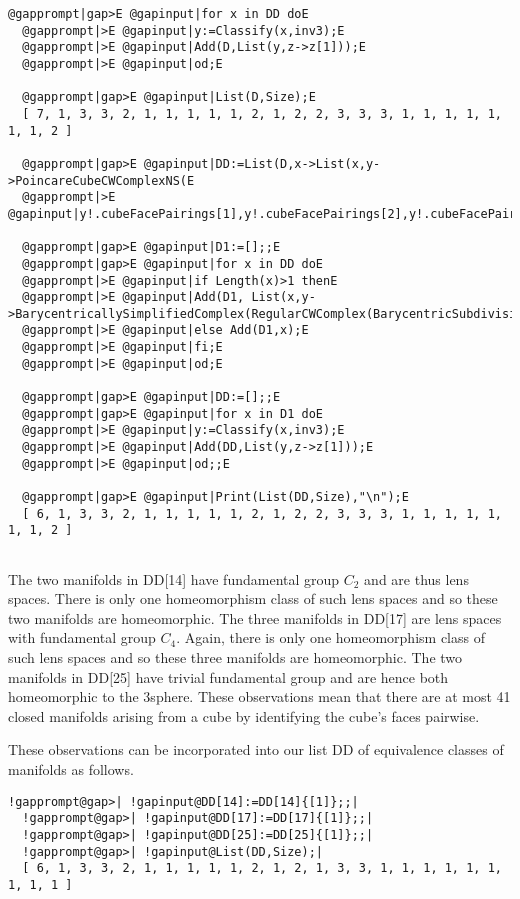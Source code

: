 \documentclass[a4paper,11pt]{report}
\begin{document}
{{\begin{Verbatim}[commandchars=@|E,fontsize=\small,frame=single,label=Example]
  @gapprompt|gap>E @gapinput|for x in DD doE
  @gapprompt|>E @gapinput|y:=Classify(x,inv3);E
  @gapprompt|>E @gapinput|Add(D,List(y,z->z[1]));E
  @gapprompt|>E @gapinput|od;E
  
  @gapprompt|gap>E @gapinput|List(D,Size);E
  [ 7, 1, 3, 3, 2, 1, 1, 1, 1, 1, 2, 1, 2, 2, 3, 3, 3, 1, 1, 1, 1, 1, 1, 1, 2 ]
  
  @gapprompt|gap>E @gapinput|DD:=List(D,x->List(x,y->PoincareCubeCWComplexNS(E
  @gapprompt|>E @gapinput|y!.cubeFacePairings[1],y!.cubeFacePairings[2],y!.cubeFacePairings[3])));;E
  
  @gapprompt|gap>E @gapinput|D1:=[];;E
  @gapprompt|gap>E @gapinput|for x in DD doE
  @gapprompt|>E @gapinput|if Length(x)>1 thenE
  @gapprompt|>E @gapinput|Add(D1, List(x,y->BarycentricallySimplifiedComplex(RegularCWComplex(BarycentricSubdivision(y)))));E
  @gapprompt|>E @gapinput|else Add(D1,x);E
  @gapprompt|>E @gapinput|fi;E
  @gapprompt|>E @gapinput|od;E
  
  @gapprompt|gap>E @gapinput|DD:=[];;E
  @gapprompt|gap>E @gapinput|for x in D1 doE
  @gapprompt|>E @gapinput|y:=Classify(x,inv3);E
  @gapprompt|>E @gapinput|Add(DD,List(y,z->z[1]));E
  @gapprompt|>E @gapinput|od;;E
  
  @gapprompt|gap>E @gapinput|Print(List(DD,Size),"\n");E
  [ 6, 1, 3, 3, 2, 1, 1, 1, 1, 1, 2, 1, 2, 2, 3, 3, 3, 1, 1, 1, 1, 1, 1, 1, 2 ]
  
\end{Verbatim}
 

The two manifolds in DD[14] have fundamental group $C_2$ and are thus lens spaces. There is only one homeomorphism class of such lens
spaces and so these two manifolds are homeomorphic. The three manifolds in
DD[17] are lens spaces with fundamental group $C_4$. Again, there is only one homeomorphism class of such lens spaces and so
these three manifolds are homeomorphic. The two manifolds in DD[25] have
trivial fundamental group and are hence both homeomorphic to the
3\texttt{}sphere. These observations mean that there are at most 41
closed manifolds arising from a cube by identifying the cube's faces pairwise. 

 These observations can be incorporated into our list DD of equivalence classes
of manifolds as follows. 
\begin{Verbatim}[commandchars=!@|,fontsize=\small,frame=single,label=Example]
  !gapprompt@gap>| !gapinput@DD[14]:=DD[14]{[1]};;|
  !gapprompt@gap>| !gapinput@DD[17]:=DD[17]{[1]};;|
  !gapprompt@gap>| !gapinput@DD[25]:=DD[25]{[1]};;|
  !gapprompt@gap>| !gapinput@List(DD,Size);|
  [ 6, 1, 3, 3, 2, 1, 1, 1, 1, 1, 2, 1, 2, 1, 3, 3, 1, 1, 1, 1, 1, 1, 1, 1, 1 ]
  

\end{Verbatim}}}
\end{document}
